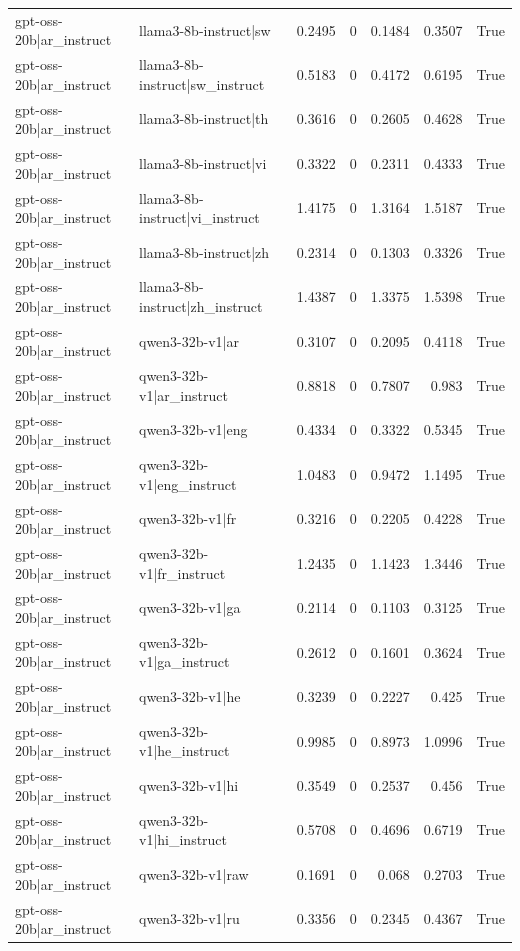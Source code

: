 \begin{table}
\begin{tabular}{l l r r r r l}
gpt-oss-20b|ar_instruct & llama3-8b-instruct|sw & 0.2495 & 0 & 0.1484 & 0.3507 & True \\
gpt-oss-20b|ar_instruct & llama3-8b-instruct|sw_instruct & 0.5183 & 0 & 0.4172 & 0.6195 & True \\
gpt-oss-20b|ar_instruct & llama3-8b-instruct|th & 0.3616 & 0 & 0.2605 & 0.4628 & True \\
gpt-oss-20b|ar_instruct & llama3-8b-instruct|vi & 0.3322 & 0 & 0.2311 & 0.4333 & True \\
gpt-oss-20b|ar_instruct & llama3-8b-instruct|vi_instruct & 1.4175 & 0 & 1.3164 & 1.5187 & True \\
gpt-oss-20b|ar_instruct & llama3-8b-instruct|zh & 0.2314 & 0 & 0.1303 & 0.3326 & True \\
gpt-oss-20b|ar_instruct & llama3-8b-instruct|zh_instruct & 1.4387 & 0 & 1.3375 & 1.5398 & True \\
gpt-oss-20b|ar_instruct & qwen3-32b-v1|ar & 0.3107 & 0 & 0.2095 & 0.4118 & True \\
gpt-oss-20b|ar_instruct & qwen3-32b-v1|ar_instruct & 0.8818 & 0 & 0.7807 & 0.983 & True \\
gpt-oss-20b|ar_instruct & qwen3-32b-v1|eng & 0.4334 & 0 & 0.3322 & 0.5345 & True \\
gpt-oss-20b|ar_instruct & qwen3-32b-v1|eng_instruct & 1.0483 & 0 & 0.9472 & 1.1495 & True \\
gpt-oss-20b|ar_instruct & qwen3-32b-v1|fr & 0.3216 & 0 & 0.2205 & 0.4228 & True \\
gpt-oss-20b|ar_instruct & qwen3-32b-v1|fr_instruct & 1.2435 & 0 & 1.1423 & 1.3446 & True \\
gpt-oss-20b|ar_instruct & qwen3-32b-v1|ga & 0.2114 & 0 & 0.1103 & 0.3125 & True \\
gpt-oss-20b|ar_instruct & qwen3-32b-v1|ga_instruct & 0.2612 & 0 & 0.1601 & 0.3624 & True \\
gpt-oss-20b|ar_instruct & qwen3-32b-v1|he & 0.3239 & 0 & 0.2227 & 0.425 & True \\
gpt-oss-20b|ar_instruct & qwen3-32b-v1|he_instruct & 0.9985 & 0 & 0.8973 & 1.0996 & True \\
gpt-oss-20b|ar_instruct & qwen3-32b-v1|hi & 0.3549 & 0 & 0.2537 & 0.456 & True \\
gpt-oss-20b|ar_instruct & qwen3-32b-v1|hi_instruct & 0.5708 & 0 & 0.4696 & 0.6719 & True \\
gpt-oss-20b|ar_instruct & qwen3-32b-v1|raw & 0.1691 & 0 & 0.068 & 0.2703 & True \\
gpt-oss-20b|ar_instruct & qwen3-32b-v1|ru & 0.3356 & 0 & 0.2345 & 0.4367 & True \\

\end{tabular}
\end{table}
